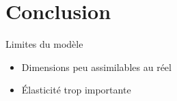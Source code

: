 \documentclass{beamer}
\begin{document}
			
	
	\section{Conclusion}
	
	\begin{frame}{Limites du modèle}
		\begin{itemize}
			\item Dimensions peu assimilables au réel
			\item Élasticité trop importante 
		\end{itemize}	
		\vspace{12pt}
		
	\end{frame}
	
	
	
	
	
	
	
	
	
\end{document}
